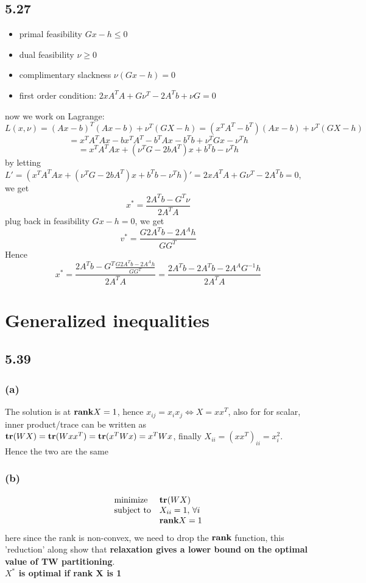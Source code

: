 \documentclass{article}
\newcommand{\tr}{{\mbox{\bf tr}}}
\newcommand{\rank}{{\mbox{\bf rank}}}
\begin{document}
\subsection*{5.27}
\begin{itemize}
\item primal feasibility $Gx - h \le 0$
\item dual feasibility $\nu \ge 0$
\item complimentary slackness $\nu(Gx - h) = 0$
\item first order condition:  $ 2xA^TA + G\nu^T - 2A^Tb  + \nu G = 0$
\end{itemize}
now we work on Lagrange: 
\[L(x,\nu) = (Ax - b)^T(Ax - b) + \nu^T(GX-h) = (x^TA^T - b^T)(Ax - b) + \nu^T(GX-h)\]
 \[ = x^TA^TAx - bx^TA^T -b^TAx - b^Tb + \nu^TGx - \nu^Th\]
 \[ = x^TA^TAx + (\nu^TG-2bA^T )x + b^Tb -\nu^Th\]
by letting  $L' =  (x^TA^TAx + (\nu^TG-2bA^T )x + b^Tb -\nu^Th)' = 2xA^TA + G\nu^T - 2A^Tb = 0 $, \\
we get \[x^* = \dfrac{2A^Tb - G^T\nu}{2A^TA} \] plug back in feasibility $Gx - h = 0$, we get
\[v^* = \dfrac{G2A^Tb - 2A^Ah}{GG^T}\]
Hence 
\[x^* = \dfrac{2A^Tb - G^T\frac{G2A^Tb - 2A^Ah}{GG^T}}{2A^TA}  =\dfrac{2A^Tb - 2A^Tb - 2A^AG^{-1}h}{2A^TA} \] 
\section*{Generalized inequalities}	
\subsection*{5.39}
\subsubsection*{(a)}
The solution is at ${\bf rank} X = 1$, hence $x_{ij} = x_ix_j \Leftrightarrow X = xx^T$, also for for scalar, inner product/trace can be written as $\tr (WX) = \tr (W xx^T) = \tr ( x^TWx)  =  x^TWx$, finally $X_{ii} = (xx^T)_{ii} = x_i^2 $.\\
Hence the two are the same
\subsubsection*{(b)}
\[\begin{array}{ll}
    \mbox{minimize}   &  \tr (WX)\\
    \mbox{subject to} & X_{ii} =1, \, \forall i \\
    & \rank X = 1
             \end{array} \]
      here since the rank is non-convex, we need to drop the $\rank$ function, this 'reduction' along show that {\bf relaxation gives a lower bound on the optimal value of TW partitioning}.\\
      {\bf $X^*$ is optimal if rank X is 1}
\end{document}
